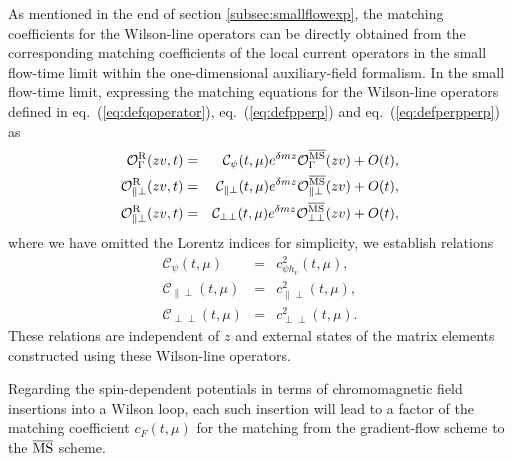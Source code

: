 As mentioned in the end of section \ref{subsec:smallflowexp}, the matching coefficients for the Wilson-line operators can be directly obtained from the corresponding matching coefficients of the local current operators in the small flow-time limit within the one-dimensional auxiliary-field formalism. In the small flow-time limit, expressing the matching equations for the Wilson-line operators defined in eq.~(\ref{eq:defqoperator}), eq.~(\ref{eq:defpperp}) and eq.~(\ref{eq:defperpperp}) as
\begin{eqnarray}
\mathcal{O}_{\Gamma}^{\rm R}(zv, t) &=& \mathcal{C}_{\psi}(t, \mu)e^{\delta m z}\mathcal{O}_{\Gamma}^{\overline{\rm MS}}(zv) + O(t) ,\\
\mathcal{O}_{\|\perp}^{\rm R} (zv, t) &=&  \mathcal{C}_{\|\perp}(t, \mu)e^{\delta m z}\mathcal{O}_{\|\perp}^{\overline{\rm MS}} (zv)+ O(t),\\ 
\mathcal{O}_{\|\perp}^{\rm R} (zv, t) &=& \mathcal{C}_{\perp\perp}(t, \mu)e^{\delta m z}\mathcal{O}_{\perp\perp}^{\overline{\rm MS}} (zv)+ O(t),
\end{eqnarray}
where we have omitted the Lorentz indices for simplicity, we establish relations
\begin{eqnarray}
\mathcal{C}_{\psi}(t, \mu) &=& c^2_{\psi h_v}(t, \mu),\\
\mathcal{C}_{\|\perp}(t, \mu) &=& c^2_{\|\perp} (t, \mu),\\
\mathcal{C}_{\perp\perp}(t, \mu) &=& c^2_{\perp\perp} (t, \mu).
\end{eqnarray}
These relations are independent of $z$ and external states of the matrix elements constructed using these Wilson-line operators. 

Regarding the spin-dependent potentials in terms of chromomagnetic field insertions into a Wilson loop, each such insertion will lead to a factor of the matching coefficient $c_F(t, \mu)$ for the matching from the gradient-flow scheme to the $\overline{\rm MS}$ scheme.


